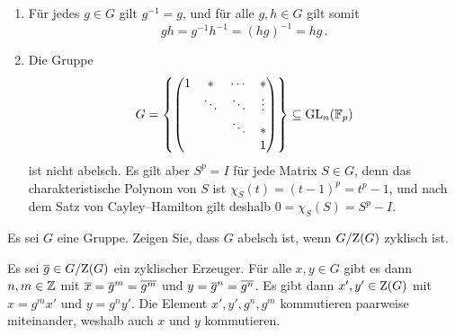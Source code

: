 \begin{solution}
  \begin{enumerate}
    \item
      Für jedes $g \in G$ gilt $g^{-1} = g$, und für alle $g, h \in G$ gilt somit
      \[
          g h
        = g^{-1} h^{-1}
        = (h g)^{-1}
        = h g \,.
      \]
    \item
      Die Gruppe
      \[
                  G
        =         \left\{
                    \begin{pmatrix}
                      1 & *       & \cdots  & *       \\
                        & \ddots  & \ddots  & \vdots  \\
                        &         & \ddots  & *       \\
                        &         &         & 1
                    \end{pmatrix}
                  \right\}
        \subseteq \operatorname{GL}_n(\mathbb{F}_p)
      \]
      ist nicht abelsch.
      Es gilt aber $S^p = I$ für jede Matrix $S \in G$, denn das charakteristische Polynom von $S$ ist $\chi_S(t) = (t-1)^p = t^p - 1$, und nach dem Satz von Cayley--Hamilton gilt deshalb $0 = \chi_S(S) = S^p - I$.
  \end{enumerate}
\end{solution}


\begin{question}[subtitle = Quotient nach dem Zentrum]
  Es sei $G$ eine Gruppe.
  Zeigen Sie, dass $G$ abelsch ist, wenn $G/{\operatorname{Z}(G)}$ zyklisch ist.
\end{question}


\begin{solution}
  Es sei $\overline{g} \in G/{\operatorname{Z}(G)}$ ein zyklischer Erzeuger.
  Für alle $x, y \in G$ gibt es dann $n, m \in \mathbb{Z}$ mit $\overline{x} = \overline{g}^m = \overline{g^m}$ und $y = \overline{g}^n = \overline{g^n}$.
  Es gibt dann $x', y' \in \operatorname{Z}(G)$ mit $x = g^m x'$ und $y = g^n y'$.
  Die Element $x', y', g^n, g^m$ kommutieren paarweise miteinander, weshalb auch $x$ und $y$ kommutieren.
\end{solution}


